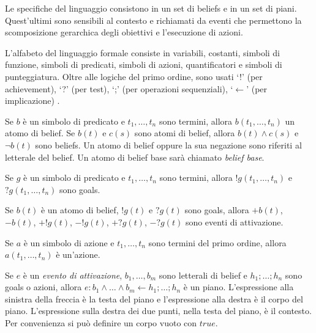 \medskip
Le specifiche del linguaggio consistono in un set di beliefs e in un set di piani. Quest'ultimi sono sensibili al contesto e richiamati da eventi che permettono la scomposizione gerarchica degli obiettivi e l'esecuzione di azioni.

L'alfabeto del linguaggio formale consiste in variabili, costanti, simboli di funzione, simboli di predicati, simboli di azioni, quantificatori e simboli di punteggiatura. Oltre alle logiche del primo ordine, sono usati `!' (per achievement), `?' (per test), `;' (per operazioni sequenziali), `$\leftarrow$' (per implicazione) \cite{AgentSpeak}.

\smallskip
\begin{defn}
Se $b$ è un simbolo di predicato e $t_1, \ldots, t_n$ sono termini, allora $b(t_1, \ldots, t_n)$ un atomo di belief. Se $b(t)$ e $c(s)$ sono atomi di belief, allora $b(t) \wedge c(s)$ e $\neg b(t)$ sono beliefs. Un atomo di belief oppure la sua negazione sono riferiti al letterale del belief. Un atomo di belief base sarà chiamato \emph{belief base}.
\end{defn}

\smallskip
\begin{defn}
Se $g$ è un simbolo di predicato e $t_1, \ldots, t_n$ sono termini, allora $!g(t_1, \ldots, t_n)$ e $?g(t_1, \ldots, t_n)$ sono goals.
\end{defn}

\smallskip
\begin{defn}
Se $b(t)$ è un atomo di belief, $!g(t)$ e $?g(t)$ sono goals, allora $+b(t)$, $-b(t)$, $+!g(t)$, $-!g(t)$, $+?g(t)$, $-?g(t)$ sono eventi di attivazione.
\end{defn}

\smallskip
\begin{defn}
Se $a$ è un simbolo di azione e $t_1, \ldots, t_n$ sono termini del primo ordine, allora $a(t_1, \ldots, t_n)$ è un'azione.
\end{defn}

\smallskip
\begin{defn}
Se $e$ è un \textit{evento di attivazione}, $b_1, \ldots, b_m$ sono letterali di belief e $h_1; \ldots; h_n$ sono goals o azioni, allora $e : b_1 \land \ldots \land b_m \leftarrow h_1; \ldots; h_n$ è un piano. L'espressione alla sinistra della freccia è la testa del piano e l'espressione alla destra è il corpo del piano. L'espressione sulla destra dei due punti, nella testa del piano, è il contesto. Per convenienza si può definire un corpo vuoto con $true$.
\end{defn}

